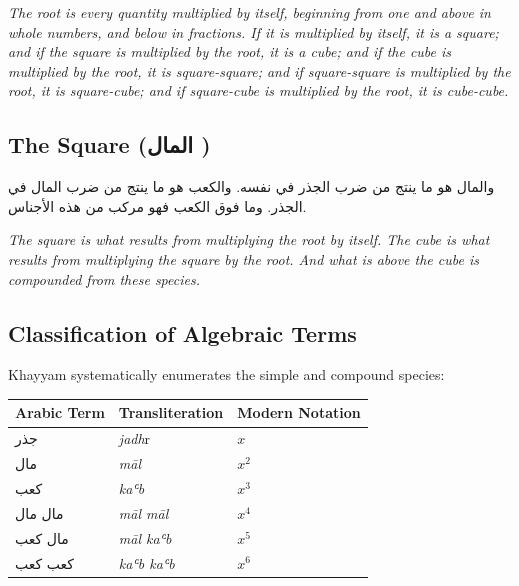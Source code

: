 \textit{The root is every quantity multiplied by itself, beginning from one and above in whole numbers, and below in fractions. If it is multiplied by itself, it is a square;
 and if the square is multiplied by the root, it is a cube;
 and if the cube is multiplied by the root, it is square-square;
 and if square-square is multiplied by the root, it is square-cube;
 and if square-cube is multiplied by the root, it is cube-cube.}

\subsection{The Square (\textarabic{المال}
)}
\label{subsec:square}

\begin{Arabic}
والمال هو ما ينتج من ضرب الجذر في نفسه. والكعب هو ما ينتج من ضرب المال في الجذر. وما فوق الكعب فهو مركب من هذه الأجناس.

\end{Arabic}

\textit{The square is what results from multiplying the root by itself. The cube is what results from multiplying the square by the root. And what is above the cube is compounded from these species.}

\subsection{Classification of Algebraic Terms}

\label{subsec:terms}
Khayyam systematically enumerates the simple and compound species:

\begin{center}

\begin{tabular}
{lll}\toprule
\textbf{Arabic Term} & 
\textbf{Transliteration} & 
\textbf{Modern Notation} \\
\midrule
\textarabic{جذر} & 
\textit{jadh}r & $x$ \\

\textarabic{مال} & 
\textit{māl} & $x^2$ \\

\textarabic{كعب} & 
\textit{kaʿb} & $x^3$ \\

\textarabic{مال مال} & 
\textit{māl māl} & $x^4$ \\

\textarabic{مال كعب} & 
\textit{māl kaʿb} & $x^5$ \\

\textarabic{كعب كعب} & 
\textit{kaʿb kaʿb} & $x^6$ \\
\bottomrule

\end{tabular}

\end{center}

